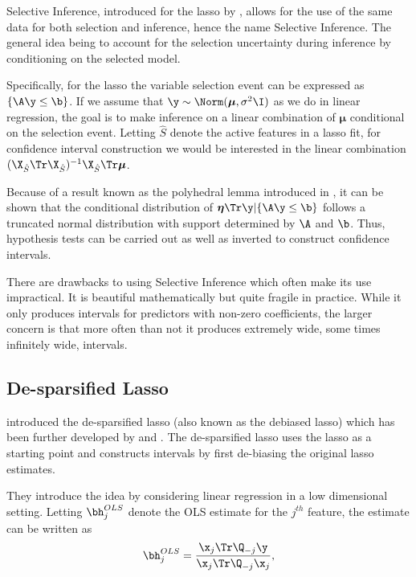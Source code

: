 Selective Inference, introduced for the lasso by \cite{Lee2016}, allows for the use of the same data for both selection and inference, hence the name Selective Inference. The general idea being to account for the selection uncertainty during inference by conditioning on the selected model. 

Specifically, for the lasso the variable selection event can be expressed as $\lbrace\A \y \leq \b \rbrace$. If we assume that $\y \sim \Norm(\boldsymbol{\mu}, \sigma^2 \I)$ as we do in linear regression, the goal is to make inference on a linear combination of $\boldsymbol{\mu}$ conditional on the selection event. Letting $\hat{S}$ denote the active features in a lasso fit, for confidence interval construction we would be interested in the linear combination $(\X_{\hat{S}}\Tr \X_{\hat{S}})^{-1} \X_{\hat{S}}\Tr \boldsymbol{\mu}$.

Because of a result known as the polyhedral lemma introduced in \cite{Lee2016}, it can be shown that the conditional distribution of $\boldsymbol{\eta}\Tr \y | \lbrace\A \y \leq \b \rbrace$ follows a truncated normal distribution with support determined by $\A$ and $\b$. Thus, hypothesis tests can be carried out as well as inverted to construct confidence intervals. 

There are drawbacks to using Selective Inference which often make its use impractical. It is beautiful mathematically but quite fragile in practice. While it only produces intervals for predictors with non-zero coefficients, the larger concern is that more often than not it produces extremely wide, some times infinitely wide, intervals. 

\subsection{De-sparsified Lasso}
\label{sec:desparsified-lasso}

\cite{ZhangZhang2014} introduced the de-sparsified lasso (also known as the debiased lasso) which has been further developed by \cite{Javanmard2014} and \cite{buhlmann2015}. The de-sparsified lasso uses the lasso as a starting point and constructs intervals by first de-biasing the original lasso estimates.

They introduce the idea by considering linear regression in a low dimensional setting. Letting $\bh_j^{OLS}$ denote the OLS estimate for the $j^{th}$ feature, the estimate can be written as
$$
\bh_j^{OLS} = \frac{\x_j\Tr \Q_{-j} \y}{\x_j\Tr \Q_{-j} \x_j},
$$


